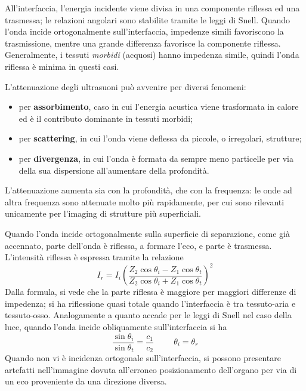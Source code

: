\documentclass[11pt, a4paper]{scrartcl}
\theoremstyle{style}
\theoremstyle{style1}
\numberwithin{equation}{subsection}
\begin{document}
All'interfaccia, l'energia incidente viene divisa in una componente riflessa ed una trasmessa; le relazioni angolari sono stabilite tramite le leggi di Snell.
Quando l'onda incide ortogonalmente sull'interfaccia, impedenze simili favoriscono la trasmissione, mentre una grande differenza favorisce la componente riflessa.
Generalmente, i tessuti \textit{morbidi} (acquosi) hanno impedenza simile, quindi l'onda riflessa \`e minima in questi casi.

L'attenuazione degli ultrasuoni pu\`o avvenire per diversi fenomeni:
\begin{itemize}
	\item per \textbf{assorbimento}, caso in cui l'energia acustica viene trasformata in calore ed \`e il contributo dominante in tessuti morbidi;
	\item per \textbf{scattering}, in cui l'onda viene deflessa da piccole, o irregolari, strutture;
	\item per \textbf{divergenza}, in cui l'onda \`e formata da sempre meno particelle per via della sua dispersione all'aumentare della profondit\`a.
\end{itemize}
L'attenuazione aumenta sia con la profondit\`a, che con la frequenza: le onde ad altra frequenza sono attenuate molto pi\`u rapidamente, per cui sono rilevanti unicamente per l'imaging di strutture pi\`u superficiali.

Quando l'onda incide ortogonalmente sulla superficie di separazione, come gi\`a accennato, parte dell'onda \`e riflessa, a formare l'eco, e parte \`e trasmessa.
L'intensit\`a riflessa \`e espressa tramite la relazione
\begin{equation}
	I_r = I_i \left(\frac{Z_2 \cos \theta _i - Z_1 \cos \theta _t}{Z_2 \cos \theta _i + Z_1 \cos \theta _t}\right) ^2
\end{equation}
Dalla formula, si vede che la parte riflessa \`e maggiore per maggiori differenze di impedenza; si ha riflessione quasi totale quando l'interfaccia \`e tra tessuto-aria e tessuto-osso.
Analogamente a quanto accade per le leggi di Snell nel caso della luce, quando l'onda incide obliquamente sull'interfaccia si ha 
\[
\frac{\sin \theta _i}{\sin \theta _t}  = \frac{c_1}{c_2} \hspace{1cm} \theta _i = \theta _r
\] 
Quando non vi \`e incidenza ortogonale sull'interfaccia, si possono presentare artefatti nell'immagine dovuta all'erroneo posizionamento dell'organo per via di un eco proveniente da una direzione diversa.
\end{document}
